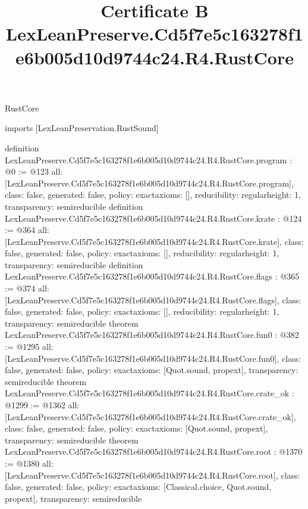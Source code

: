 \begin{lexlean}{RustCore}
\title{Certificate B LexLeanPreserve.Cd5f7e5c163278f1e6b005d10d9744c24.R4.RustCore}
\begin{coremodule}
imports [LexLeanPreservation.RustSound]

definition LexLeanPreserve.Cd5f7e5c163278f1e6b005d10d9744c24.R4.RustCore.program : @0 := @123 {
  all: [LexLeanPreserve.Cd5f7e5c163278f1e6b005d10d9744c24.R4.RustCore.program],
  class: false,
  generated: false,
  policy: exact{axioms: []},
  reducibility: regular{height: 1},
  transparency: semireducible
}
definition LexLeanPreserve.Cd5f7e5c163278f1e6b005d10d9744c24.R4.RustCore.krate : @124 := @364 {
  all: [LexLeanPreserve.Cd5f7e5c163278f1e6b005d10d9744c24.R4.RustCore.krate],
  class: false,
  generated: false,
  policy: exact{axioms: []},
  reducibility: regular{height: 1},
  transparency: semireducible
}
definition LexLeanPreserve.Cd5f7e5c163278f1e6b005d10d9744c24.R4.RustCore.flags : @365 := @374 {
  all: [LexLeanPreserve.Cd5f7e5c163278f1e6b005d10d9744c24.R4.RustCore.flags],
  class: false,
  generated: false,
  policy: exact{axioms: []},
  reducibility: regular{height: 1},
  transparency: semireducible
}
theorem LexLeanPreserve.Cd5f7e5c163278f1e6b005d10d9744c24.R4.RustCore.fun0 : @382 := @1295 {
  all: [LexLeanPreserve.Cd5f7e5c163278f1e6b005d10d9744c24.R4.RustCore.fun0],
  class: false,
  generated: false,
  policy: exact{axioms: [Quot.sound, propext]},
  transparency: semireducible
}
theorem LexLeanPreserve.Cd5f7e5c163278f1e6b005d10d9744c24.R4.RustCore.crate_ok : @1299 := @1362 {
  all: [LexLeanPreserve.Cd5f7e5c163278f1e6b005d10d9744c24.R4.RustCore.crate_ok],
  class: false,
  generated: false,
  policy: exact{axioms: [Quot.sound, propext]},
  transparency: semireducible
}
theorem LexLeanPreserve.Cd5f7e5c163278f1e6b005d10d9744c24.R4.RustCore.root : @1370 := @1380 {
  all: [LexLeanPreserve.Cd5f7e5c163278f1e6b005d10d9744c24.R4.RustCore.root],
  class: false,
  generated: false,
  policy: exact{axioms: [Classical.choice, Quot.sound, propext]},
  transparency: semireducible
}


\end{coremodule}
\end{lexlean}
